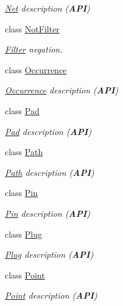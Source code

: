 \begin{DoxyCompactItemize}
\begin{DoxyCompactList}\small\item\em \hyperlink{classHurricane_1_1Net}{Net} description ({\bfseries A\+PI}) \end{DoxyCompactList}\item 
class \hyperlink{classHurricane_1_1NotFilter}{Not\+Filter}
\begin{DoxyCompactList}\small\item\em \hyperlink{classHurricane_1_1Filter}{Filter} negation. \end{DoxyCompactList}\item 
class \hyperlink{classHurricane_1_1Occurrence}{Occurrence}
\begin{DoxyCompactList}\small\item\em \hyperlink{classHurricane_1_1Occurrence}{Occurrence} description ({\bfseries A\+PI}) \end{DoxyCompactList}\item 
class \hyperlink{classHurricane_1_1Pad}{Pad}
\begin{DoxyCompactList}\small\item\em \hyperlink{classHurricane_1_1Pad}{Pad} description ({\bfseries A\+PI}) \end{DoxyCompactList}\item 
class \hyperlink{classHurricane_1_1Path}{Path}
\begin{DoxyCompactList}\small\item\em \hyperlink{classHurricane_1_1Path}{Path} description ({\bfseries A\+PI}) \end{DoxyCompactList}\item 
class \hyperlink{classHurricane_1_1Pin}{Pin}
\begin{DoxyCompactList}\small\item\em \hyperlink{classHurricane_1_1Pin}{Pin} description ({\bfseries A\+PI}) \end{DoxyCompactList}\item 
class \hyperlink{classHurricane_1_1Plug}{Plug}
\begin{DoxyCompactList}\small\item\em \hyperlink{classHurricane_1_1Plug}{Plug} description ({\bfseries A\+PI}) \end{DoxyCompactList}\item 
class \hyperlink{classHurricane_1_1Point}{Point}
\begin{DoxyCompactList}\small\item\em \hyperlink{classHurricane_1_1Point}{Point} description ({\bfseries A\+PI}) \end{DoxyCompactList}\item 

\end{DoxyCompactItemize}
